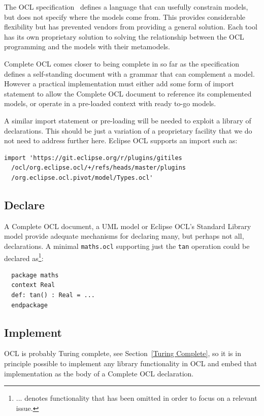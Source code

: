 \documentclass[sigconf]{acmart}
\begin{document}
The OCL specification~\cite{OCL-2.4} defines a language that can usefully constrain models, but does not specify where the models come from. This provides considerable flexibility but has prevented vendors from providing a general solution. Each tool has its own proprietary solution to solving the relationship between the OCL programming and the models with their metamodels.

Complete OCL comes closer to being complete in so far as the specification defines a self-standing document with a grammar that can complement a model. However a practical implementation must either add some form of import statement to allow the Complete OCL document to reference its complemented models, or operate in a pre-loaded context with ready to-go models.

A similar import statement or pre-loading will be needed to exploit a library of declarations. This should be just a variation of a proprietary facility that we do not need to address further here. Eclipse OCL supports an import such as:

\begin{verbatim}
import 'https://git.eclipse.org/r/plugins/gitiles
  /ocl/org.eclipse.ocl/+/refs/heads/master/plugins
  /org.eclipse.ocl.pivot/model/Types.ocl'
\end{verbatim} 

\subsection{Declare}

A Complete OCL document, a UML model or Eclipse OCL's Standard Library model provide adequate mechanisms for declaring many, but perhaps not all, declarations. A minimal \verb|maths.ocl| supporting just the \verb|tan| operation could be declared as\footnote{... denotes functionality that has been omitted in order to focus on a relevant issue.}:

\begin{verbatim}
  package maths
  context Real
  def: tan() : Real = ...
  endpackage
\end{verbatim} 

\subsection{Implement}

OCL is probably Turing complete, see Section~\ref{Turing Complete}, so it is in principle possible to implement any library functionality in OCL and embed that implementation as the body of a Complete OCL declaration.
\end{document}

